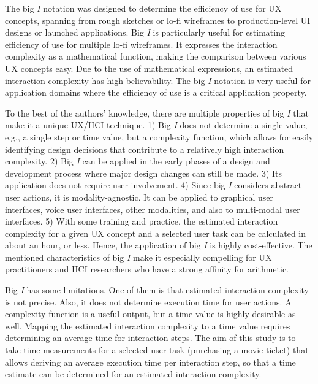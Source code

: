 The big \textit{I} notation was designed to determine the efficiency of use for UX concepts, spanning from rough sketches or lo-fi wireframes to production-level UI designs or launched applications. Big \textit{I} is particularly useful for estimating efficiency of use for multiple lo-fi wireframes. It expresses the interaction complexity as a mathematical function, making the comparison between various UX concepts easy. Due to the use of mathematical expressions, an estimated interaction complexity has high believability. The big \textit{I} notation is very useful for application domains where the efficiency of use is a critical application property.

To the best of the authors' knowledge, there are multiple properties of big \textit{I} that make it a unique UX/HCI technique. 1) Big \textit{I} does not determine a single value, e.g., a single step or time value, but a complexity function, which allows for easily identifying design decisions that contribute to a relatively high interaction complexity. 2) Big \textit{I} can be applied in the early phases of a design and development process where major design changes can still be made. 3) Its application does not require user involvement. 4) Since big \textit{I} considers abstract user actions, it is modality-agnostic. It can be applied to graphical user interfaces, voice user interfaces, other modalities, and also to multi-modal user interfaces. 5) With some training and practice, the estimated interaction complexity for a given UX concept and a selected user task can be calculated in about an hour, or less. Hence, the application of big \textit{I} is highly cost-effective. The mentioned characteristics of big \textit{I} make it especially compelling for UX practitioners and HCI researchers who have a strong affinity for arithmetic.

Big \textit{I} has some limitations. One of them is that estimated interaction complexity is not precise. Also, it does not determine execution time for user actions. A complexity function is a useful output, but a time value is highly desirable as well. Mapping the estimated interaction complexity to a time value requires determining an average time for interaction steps. The aim of this study is to take time measurements for a selected user task (purchasing a movie ticket) that allows deriving an average execution time per interaction step, so that a time estimate can be determined for an estimated interaction complexity.


